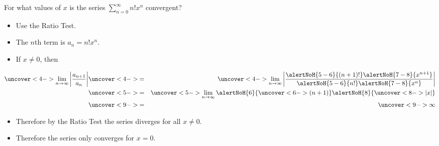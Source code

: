 \begin{frame}
\begin{example} %
For what values of $x$ is the series $\sum_{n=0}^\infty n! x^n$ convergent?
\begin{itemize}
\item<2->  Use the Ratio Test.
\item<3->  The $n$th term is $a_n = n! x^n$.
\item<4->  If $x\neq 0$, then
\end{itemize}
\abovedisplayskip=0pt
\belowdisplayskip=0pt
\begin{eqnarray*}
\uncover<4->{%
\lim_{n\to\infty} \left| \frac{a_{n+1}}{a_n}\right|%
}%
& \uncover<4->{ = } &%
\uncover<4->{%
\lim_{n\to\infty} \left| \frac{\alertNoH{ 5-6}{(n+1)!}\alertNoH{ 7-8}{x^{n+1}}}{\alertNoH{ 5-6}{n!}\alertNoH{ 7-8}{x^n}}\right|%
}\\%
& \uncover<5->{ = } &%
\uncover<5->{%
\lim_{n\to\infty} \alertNoH{ 6}{\uncover<6->{(n+1)}}\alertNoH{ 8}{\uncover<8->{|x|}}%
}\\%
& \uncover<9->{ = } &%
\uncover<9->{%
\infty%
}%
\end{eqnarray*}
\begin{itemize}
\item<10->  Therefore by the Ratio Test the series diverges for all $x\neq 0$.
\item<11->  Therefore the series only converges for $x = 0$.
\end{itemize}
\end{example}
\end{frame}
